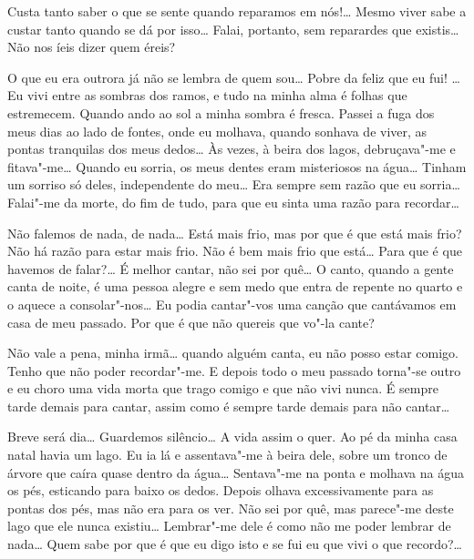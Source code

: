  Custa tanto saber o que se sente
quando reparamos em nós!\ldots{}
Mesmo viver sabe a custar tanto quando se dá por
isso\ldots{} Falai,
portanto, sem reparardes que existis\ldots{} 
Não nos íeis dizer quem éreis?

 O que eu era outrora já
não se lembra de quem sou\ldots{} Pobre da
feliz que eu fui! \ldots{} Eu vivi entre as
sombras dos ramos, e tudo na
minha alma é folhas que estremecem.
Quando ando ao sol a minha sombra é
fresca. Passei a fuga dos meus dias ao
lado de fontes, onde eu molhava,
quando sonhava de viver, as pontas 
tranquilas dos meus dedos\ldots{} Às
vezes, à beira dos lagos, debruçava"-me 
e fitava"-me\ldots{} Quando eu
sorria, os meus dentes eram misteriosos
na água\ldots{} Tinham um sorriso só
deles, independente do meu\ldots{} 
Era sempre sem razão que eu sorria\ldots{}
Falai"-me da morte, do fim de tudo, para
que eu sinta uma razão para recordar\ldots{}

 Não falemos de nada,
de nada\ldots{} Está mais frio, mas por que é
que está mais frio? Não há razão para estar
mais frio. Não é bem mais
frio que está\ldots{} Para que é que 
havemos de falar?\ldots{} É melhor cantar,
não sei por quê\ldots{} O canto, quando a
gente canta de noite, é uma pessoa
alegre e sem medo que entra de repente no quarto e o aquece a
consolar"-nos\ldots{} Eu podia cantar"-vos
uma canção que cantávamos em
casa de meu passado. Por que é que não quereis que vo"-la cante?

 Não vale a pena, minha
irmã\ldots{} quando alguém canta, eu não
posso estar comigo. Tenho que não poder
recordar"-me. E depois todo o
meu passado torna"-se outro e eu 
choro uma vida morta que trago comigo
e que não vivi nunca. É sempre tarde demais para cantar, assim como é
sempre tarde demais para não cantar\ldots{}

\hfill{} 

 Breve será dia\ldots{} 
Guardemos silêncio\ldots{} A vida assim o quer.
Ao pé da minha casa natal havia um lago.
Eu ia lá e assentava"-me à
beira dele, sobre um tronco de árvore que 
caíra quase dentro da água\ldots{}
Sentava"-me na ponta e molhava na água os pés,
esticando para baixo os
dedos. Depois olhava excessivamente para as
pontas dos pés, mas não era
para os ver. Não sei por quê, mas parece"-me
deste lago que ele nunca
existiu\ldots{} Lembrar"-me dele é como não
me poder lembrar de nada\ldots{}
Quem sabe por que é que eu digo isto e se fui eu que vivi o que
recordo?\ldots{}

